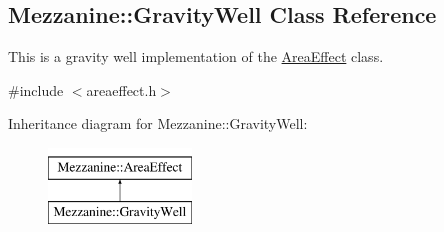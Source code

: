 \hypertarget{classMezzanine_1_1GravityWell}{
\subsection{Mezzanine::GravityWell Class Reference}
\label{classMezzanine_1_1GravityWell}
}


This is a gravity well implementation of the \hyperlink{classMezzanine_1_1AreaEffect}{AreaEffect} class.  




{\ttfamily \#include $<$areaeffect.h$>$}

Inheritance diagram for Mezzanine::GravityWell:\begin{figure}[H]
\begin{center}
\leavevmode
\includegraphics[height=2.000000cm]{classMezzanine_1_1GravityWell}
\end{center}
\end{figure}
